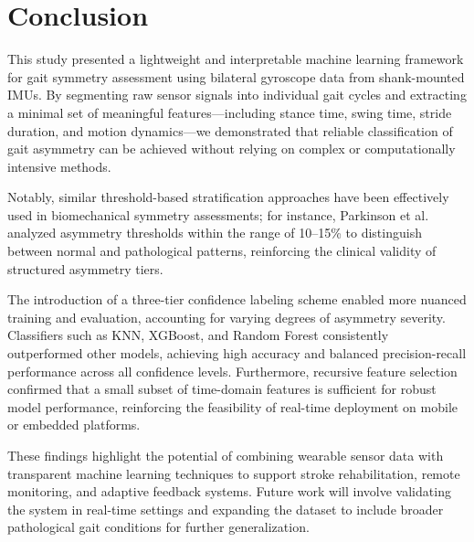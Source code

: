 \section{Conclusion}
\label{sec:conclusion}

This study presented a lightweight and interpretable machine learning framework for gait symmetry assessment using bilateral gyroscope data from shank-mounted IMUs. 
By segmenting raw sensor signals into individual gait cycles and extracting a minimal set of meaningful features—including stance time, swing time, 
stride duration, and motion dynamics—we demonstrated that reliable classification of gait asymmetry can be achieved without relying on complex or computationally 
intensive methods. 

Notably, similar threshold-based stratification approaches have been effectively used in biomechanical symmetry assessments; for instance, 
Parkinson et al.~\cite{ref24} analyzed asymmetry thresholds within the range of 10–15\% to distinguish between normal and pathological patterns, 
reinforcing the clinical validity of structured asymmetry tiers.

The introduction of a three-tier confidence labeling scheme enabled more nuanced training and evaluation, accounting for varying degrees of asymmetry severity. 
Classifiers such as KNN, XGBoost, and Random Forest consistently outperformed other models, achieving high accuracy and balanced precision-recall performance 
across all confidence levels. Furthermore, recursive feature selection confirmed that a small subset of time-domain features is sufficient for robust model 
performance, reinforcing the feasibility of real-time deployment on mobile or embedded platforms.

These findings highlight the potential of combining wearable sensor data with transparent machine learning techniques to support stroke rehabilitation, remote 
monitoring, and adaptive feedback systems. Future work will involve validating the system in real-time settings and expanding the dataset to include broader 
pathological gait conditions for further generalization.